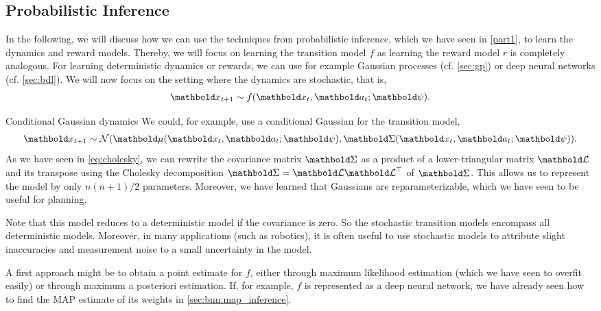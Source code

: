 \subsection{Probabilistic Inference}

In the following, we will discuss how we can use the techniques from probabilistic inference, which we have seen in \cref{part1}, to learn the dynamics and reward models.
Thereby, we will focus on learning the transition model $f$ as learning the reward model $r$ is completely analogous.
For learning deterministic dynamics or rewards, we can use for example Gaussian processes (cf. \cref{sec:gp}) or deep neural networks (cf. \cref{sec:bdl}).
We will now focus on the setting where the dynamics are stochastic, that is, \begin{align}
  \vx_{t+1} \sim f(\vx_t, \va_t; \vpsi).
\end{align}

\begin{ex}{Conditional Gaussian dynamics}{}
  We could, for example, use a conditional Gaussian for the transition model, \begin{align}
    \vx_{t+1} \sim \N{\vmu(\vx_t, \va_t; \vpsi)}{\mSigma(\vx_t, \va_t; \vpsi)}. \label{eq:conditional_gaussian_dynamics}
  \end{align}
  As we have seen in \cref{eq:cholesky}, we can rewrite the covariance matrix $\mSigma$ as a product of a lower-triangular matrix $\mCalL$ and its transpose using the Cholesky decomposition ${\mSigma = \mCalL \transpose{\mCalL}}$ of $\mSigma$.
  This allows us to represent the model by only $n (n + 1) / 2$ parameters.
  Moreover, we have learned that Gaussians are reparameterizable, which we have seen to be useful for planning.

  Note that this model reduces to a deterministic model if the covariance is zero.
  So the stochastic transition models encompass all deterministic models.
  Moreover, in many applications (such as robotics), it is often useful to use stochastic models to attribute slight inaccuracies and measurement noise to a small uncertainty in the model.
\end{ex}

A first approach might be to obtain a point estimate for $f$, either through maximum likelihood estimation (which we have seen to overfit easily) or through maximum a posteriori estimation.
If, for example, $f$ is represented as a deep neural network, we have already seen how to find the MAP estimate of its weights in \cref{sec:bnn:map_inference}.


